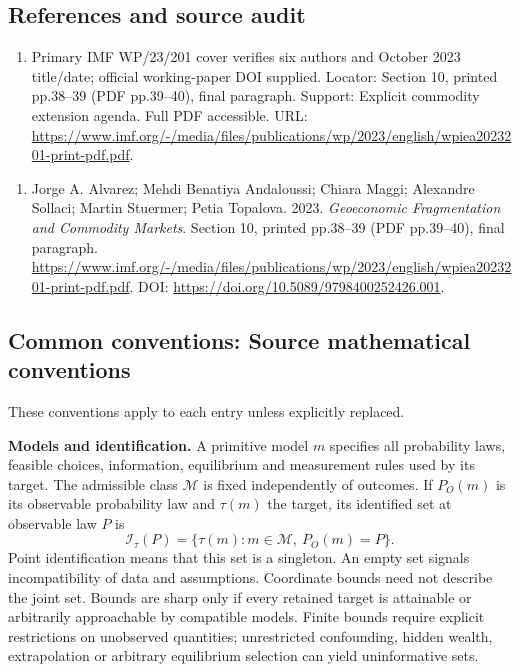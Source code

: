 \documentclass[11pt,a4paper]{article}
\begin{document}
\subsection*{References and source audit}
\begin{enumerate}
\item Primary IMF WP/23/201 cover verifies six authors and October 2023 title/date; official working-paper DOI supplied. Locator: Section 10, printed pp.38--39 (PDF pp.39--40), final paragraph. Support: Explicit commodity extension agenda. Full PDF accessible. URL: \url{https://www.imf.org/-/media/files/publications/wp/2023/english/wpiea2023201-print-pdf.pdf}.
\end{enumerate}
\begin{enumerate}\raggedright
\item\hypertarget{definitions:source:30007630:1}{} Jorge A. Alvarez; Mehdi Benatiya Andaloussi; Chiara Maggi; Alexandre Sollaci; Martin Stuermer; Petia Topalova. 2023. \emph{Geoeconomic Fragmentation and Commodity Markets}. Section 10, printed pp.38--39 (PDF pp.39--40), final paragraph.
\url{https://www.imf.org/-/media/files/publications/wp/2023/english/wpiea2023201-print-pdf.pdf}.
DOI: \url{https://doi.org/10.5089/9798400252426.001}.
\end{enumerate}

\subsection*{Common conventions: Source mathematical conventions}

These conventions apply to each entry unless explicitly replaced.

\textbf{Models and identification.} A primitive model \(m\) specifies all probability laws, feasible choices, information, equilibrium and measurement rules used by its target. The admissible class \(\mathcal M\) is fixed independently of outcomes. If \(P_O(m)\) is its observable probability law and \(\tau(m)\) the target, its identified set at observable law \(P\) is
\[
 \mathcal I_\tau(P)=\{\tau(m):m\in\mathcal M,\ P_O(m)=P\}.
\]
Point identification means that this set is a singleton. An empty set signals incompatibility of data and assumptions. Coordinate bounds need not describe the joint set. Bounds are sharp only if every retained target is attainable or arbitrarily approachable by compatible models. Finite bounds require explicit restrictions on unobserved quantities; unrestricted confounding, hidden wealth, extrapolation or arbitrary equilibrium selection can yield uninformative sets.
\end{document}

